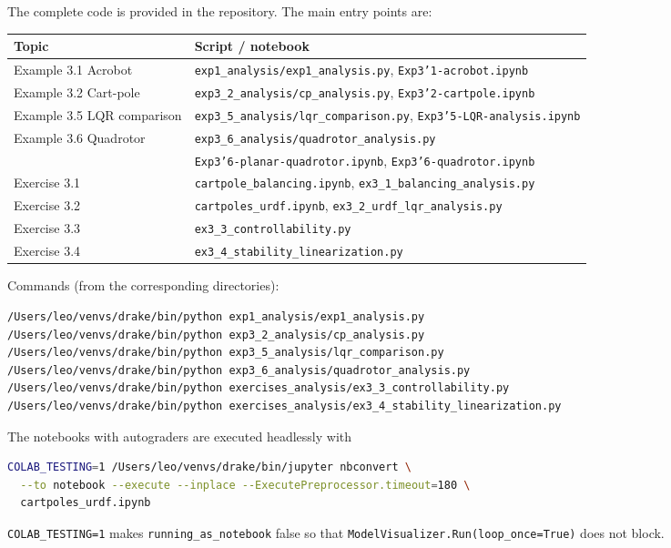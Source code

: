 \documentclass[11pt]{article}
\begin{document}
The complete code is provided in the repository.  The main entry points are:
\begin{center}
\small
\begin{tabular}{ll}
\toprule
Topic & Script / notebook \\
\midrule
Example 3.1 Acrobot & \texttt{exp1\_analysis/exp1\_analysis.py}, \texttt{Exp3'1-acrobot.ipynb} \\
Example 3.2 Cart-pole & \texttt{exp3\_2\_analysis/cp\_analysis.py}, \texttt{Exp3'2-cartpole.ipynb} \\
Example 3.5 LQR comparison & \texttt{exp3\_5\_analysis/lqr\_comparison.py}, \texttt{Exp3'5-LQR-analysis.ipynb} \\
Example 3.6 Quadrotor & \texttt{exp3\_6\_analysis/quadrotor\_analysis.py} \\
 & \texttt{Exp3'6-planar-quadrotor.ipynb}, \texttt{Exp3'6-quadrotor.ipynb} \\
Exercise 3.1 & \texttt{cartpole\_balancing.ipynb}, \texttt{ex3\_1\_balancing\_analysis.py} \\
Exercise 3.2 & \texttt{cartpoles\_urdf.ipynb}, \texttt{ex3\_2\_urdf\_lqr\_analysis.py} \\
Exercise 3.3 & \texttt{ex3\_3\_controllability.py} \\
Exercise 3.4 & \texttt{ex3\_4\_stability\_linearization.py} \\
\bottomrule
\end{tabular}
\end{center}

Commands (from the corresponding directories):
\begin{lstlisting}[language=bash]
/Users/leo/venvs/drake/bin/python exp1_analysis/exp1_analysis.py
/Users/leo/venvs/drake/bin/python exp3_2_analysis/cp_analysis.py
/Users/leo/venvs/drake/bin/python exp3_5_analysis/lqr_comparison.py
/Users/leo/venvs/drake/bin/python exp3_6_analysis/quadrotor_analysis.py
/Users/leo/venvs/drake/bin/python exercises_analysis/ex3_3_controllability.py
/Users/leo/venvs/drake/bin/python exercises_analysis/ex3_4_stability_linearization.py
\end{lstlisting}

The notebooks with autograders are executed headlessly with
\begin{lstlisting}[language=bash]
COLAB_TESTING=1 /Users/leo/venvs/drake/bin/jupyter nbconvert \
  --to notebook --execute --inplace --ExecutePreprocessor.timeout=180 \
  cartpoles_urdf.ipynb
\end{lstlisting}
\begin{sloppypar}
\texttt{COLAB\_TESTING=1} makes \texttt{running\_as\_notebook} false so that
\texttt{ModelVisualizer.Run(loop\_once=True)} does not block.
\end{sloppypar}
\end{document}
